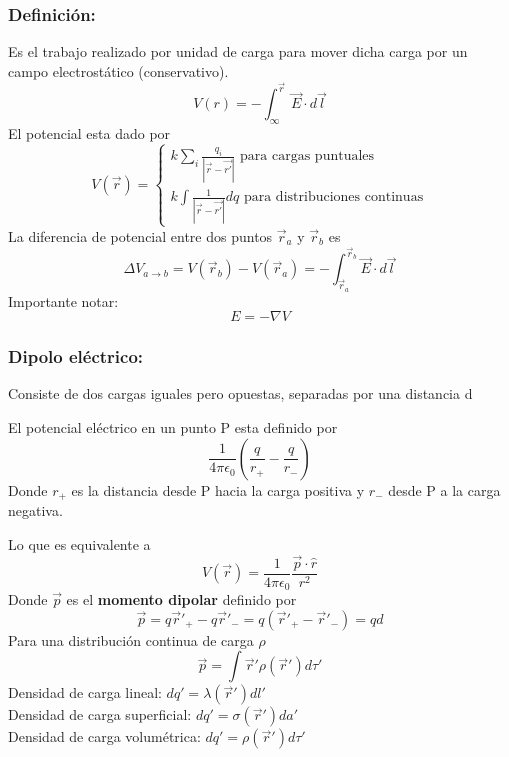 \documentclass[a4paper, 10pt]{article}
\begin{document}
\begin{multicols*}{2}
	\subsubsection{Definición:}
  Es el trabajo realizado por unidad de carga para mover 
  dicha carga por un campo electrostático (conservativo).
	\begin{equation}
	  V(r) = -\int^{\vec{r}}_\infty \vec{E} \cdot d\vec{l}
	\end{equation}
	El potencial esta dado por
  \begin{equation}
    V(\vec{r}) = \begin{cases} k \sum_i \frac{q_i}{|\vec{r} - \vec{r'}|} \text{ para cargas puntuales}
    \\ k \int \frac{1}{|\vec{r} - \vec{r'}|} dq \text{ para distribuciones continuas} \end{cases}
  \end{equation} 
	La diferencia de potencial entre dos puntos $\vec{r}_a$ y $\vec{r}_b$ es
  \begin{equation}
    \Delta V_{a \rightarrow b} = V(\vec{r}_b)-V(\vec{r}_a)=- \int_{\vec{r}_a}^{\vec{r}_b}\vec{E}\cdot d\vec{l}
  \end{equation}
	Importante notar:
	\begin{equation}
	  E = - \nabla V
	\end{equation}
	\subsubsection{Dipolo eléctrico:}
  Consiste de dos cargas iguales pero opuestas, separadas por una distancia d
	    
	El potencial eléctrico en un punto P esta definido por
  \begin{equation}
    \frac{1}{4 \pi \epsilon_0}(\frac{q}{r_+} - \frac{q}{r_-})
  \end{equation}
	Donde $r_+$ es la distancia desde P hacia la carga positiva y $r_-$ desde P a la carga negativa.
	    
	Lo que es equivalente a 
  \begin{equation}
    V(\vec{r})= \frac{1}{4 \pi \epsilon_0}\frac{\vec{p}\cdot\hat{r}}{r^2}
  \end{equation}
	Donde $\vec{p}$ es el \textbf{momento dipolar} definido por
  \begin{equation}
    \vec{p}=q\vec{r}'_+-q\vec{r}'_-=q(\vec{r}'_+-\vec{r}'_-)=qd
  \end{equation}
	Para una distribución continua de carga $\rho$
  \begin{equation}
    \vec{p}= \int \vec{r}'\rho(\vec{r}') d \tau'
  \end{equation}
	Densidad de carga lineal: $dq'=\lambda(\vec{r}')dl'$\\
	Densidad de carga superficial: $dq'=\sigma(\vec{r}')da'$\\
	Densidad de carga volumétrica: $dq'= \rho(\vec{r}')d\tau'$\\

\end{multicols*}
\end{document}

